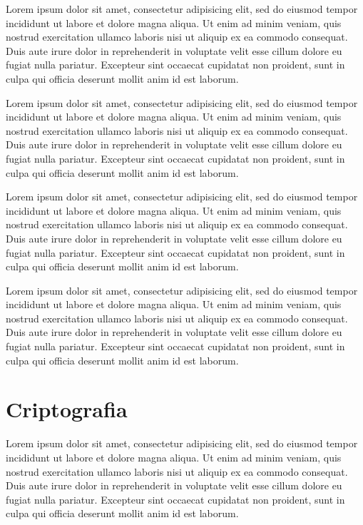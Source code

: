 \documentclass[
	12pt,				%
	twoside,			%
	a4paper,			%
	chapter=TITLE,		%
	english,			%
	brazil				%
	]{tcc}
\begin{document}


	Lorem ipsum dolor sit amet, consectetur adipisicing elit, sed do eiusmod
	tempor incididunt ut labore et dolore magna aliqua. Ut enim ad minim veniam,
	quis nostrud exercitation ullamco laboris nisi ut aliquip ex ea commodo
	consequat. Duis aute irure dolor in reprehenderit in voluptate velit esse
	cillum dolore eu fugiat nulla pariatur. Excepteur sint occaecat cupidatat non
	proident, sunt in culpa qui officia deserunt mollit anim id est laborum.

	Lorem ipsum dolor sit amet, consectetur adipisicing elit, sed do eiusmod
	tempor incididunt ut labore et dolore magna aliqua. Ut enim ad minim veniam,
	quis nostrud exercitation ullamco laboris nisi ut aliquip ex ea commodo
	consequat. Duis aute irure dolor in reprehenderit in voluptate velit esse
	cillum dolore eu fugiat nulla pariatur. Excepteur sint occaecat cupidatat non
	proident, sunt in culpa qui officia deserunt mollit anim id est laborum.

	Lorem ipsum dolor sit amet, consectetur adipisicing elit, sed do eiusmod
	tempor incididunt ut labore et dolore magna aliqua. Ut enim ad minim veniam,
	quis nostrud exercitation ullamco laboris nisi ut aliquip ex ea commodo
	consequat. Duis aute irure dolor in reprehenderit in voluptate velit esse
	cillum dolore eu fugiat nulla pariatur. Excepteur sint occaecat cupidatat non
	proident, sunt in culpa qui officia deserunt mollit anim id est laborum.

	Lorem ipsum dolor sit amet, consectetur adipisicing elit, sed do eiusmod
	tempor incididunt ut labore et dolore magna aliqua. Ut enim ad minim veniam,
	quis nostrud exercitation ullamco laboris nisi ut aliquip ex ea commodo
	consequat. Duis aute irure dolor in reprehenderit in voluptate velit esse
	cillum dolore eu fugiat nulla pariatur. Excepteur sint occaecat cupidatat non
	proident, sunt in culpa qui officia deserunt mollit anim id est laborum.

	\section{Criptografia}

	Lorem ipsum dolor sit amet, consectetur adipisicing elit, sed do eiusmod
	tempor incididunt ut labore et dolore magna aliqua. Ut enim ad minim veniam,
	quis nostrud exercitation ullamco laboris nisi ut aliquip ex ea commodo
	consequat. Duis aute irure dolor in reprehenderit in voluptate velit esse
	cillum dolore eu fugiat nulla pariatur. Excepteur sint occaecat cupidatat non
	proident, sunt in culpa qui officia deserunt mollit anim id est laborum.
\end{document}
